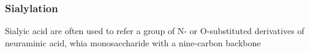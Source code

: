 \subsubsection {Sialylation}
Sialyic acid are often used to refer a group of N- or O-substituted derivatives of neuraminic acid, whia monosaccharide with a nine-carbon backbone